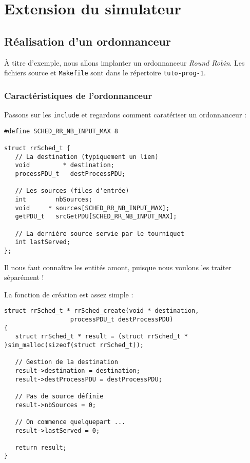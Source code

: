 %
\section{Extension du simulateur}
\label{section:extension}


%
\subsection{Réalisation d'un ordonnanceur}
\label{subsection:tut-ordo}

   À titre d'exemple, nous allons implanter un ordonnanceur {\em Round
Robin}. Les fichiers source et {\tt Makefile} sont dans le
répertoire {\tt tuto-prog-1}.

%
\subsubsection{Caractéristiques de l'ordonnanceur}

   Passons sur les {\tt include} et regardons comment caratériser un
ordonnanceur :

\begin{verbatim}
#define SCHED_RR_NB_INPUT_MAX 8

struct rrSched_t {
   // La destination (typiquement un lien)
   void         * destination;
   processPDU_t   destProcessPDU;

   // Les sources (files d'entrée)
   int        nbSources;
   void     * sources[SCHED_RR_NB_INPUT_MAX];
   getPDU_t   srcGetPDU[SCHED_RR_NB_INPUT_MAX];

   // La dernière source servie par le tourniquet
   int lastServed;
};
\end{verbatim}

   Il nous faut connaître les entités amont, puisque nous voulons les
traiter séparément !

   La fonction de création est assez simple :

\begin{verbatim}
struct rrSched_t * rrSched_create(void * destination,
				  processPDU_t destProcessPDU)
{
   struct rrSched_t * result = (struct rrSched_t * )sim_malloc(sizeof(struct rrSched_t));

   // Gestion de la destination
   result->destination = destination;
   result->destProcessPDU = destProcessPDU;

   // Pas de source définie
   result->nbSources = 0;

   // On commence quelquepart ...
   result->lastServed = 0;

   return result;
}
\end{verbatim}

